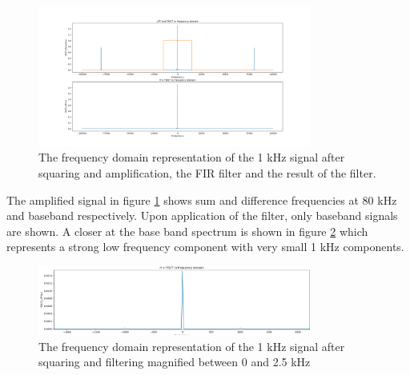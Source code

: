 \begin{figure}[ht!]
    \centering
    \includegraphics[width=0.8\textwidth]{Figures/SigSimulation/yRxsqr_LPFfftAmp1000.png}
    \caption{The frequency domain representation of the 1 kHz signal after squaring and amplification, the FIR filter and the result of the filter.}
    \label{fig:sqrfiltamp}
\end{figure}
The amplified signal in figure \ref{fig:sqrfiltamp} shows sum and difference frequencies at 80 kHz and baseband respectively. Upon application of the filter, only baseband signals are shown. A closer at the base band spectrum is shown in figure \ref{fig:sqrcrop} which represents a strong low frequency component with very small 1 kHz components.
\begin{figure}[ht!]
    \centering
    \includegraphics[width=0.8\textwidth]{Figures/SigSimulation/cropzoomedinyRxfilt.png}
    \caption{The frequency domain representation of the 1 kHz signal after squaring and filtering magnified between 0 and 2.5 kHz}
    \label{fig:sqrcrop}
\end{figure}


